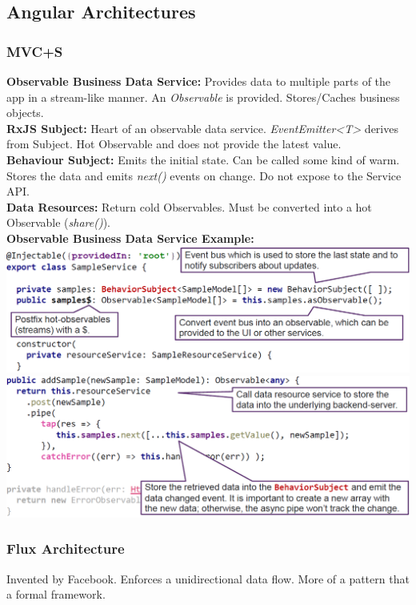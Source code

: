 \subsection{Angular Architectures}
\subsubsection{MVC+S}
\textbf{Observable Business Data Service:} Provides data to multiple parts of the app in a stream-like manner.
An \textit{Observable} is provided.
Stores/Caches business objects.\\
\textbf{RxJS Subject:} Heart of an observable data service. \textit{EventEmitter<T>} derives from Subject.
Hot Observable and does not provide the latest value.\\
\textbf{Behaviour Subject:} Emits the initial state.
Can be called some kind of warm.
Stores the data and emits \textit{next()} events on change.
Do not expose to the Service API.\\
\textbf{Data Resources:} Return cold Observables.
Must be converted into a hot Observable (\textit{share()}).\\
\textbf{Observable Business Data Service Example:}
\includegraphics[width=\linewidth]{img/angular_observable_business_data_service.png}
\includegraphics[width=\linewidth]{img/angular_observable_business_data_service2.png}

\subsubsection{Flux Architecture}
Invented by Facebook.
Enforces a unidirectional data flow.
More of a pattern that a formal framework.

